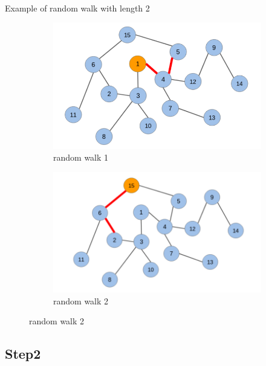     \paragraph{} Example of random walk with length 2
    \begin{figure}[h]
        \centering
        \begin{subfigure}[b]{0.5\textwidth}
                    \includegraphics[width=\textwidth]{tex/img/G1.png}
                    \caption{random walk 1}
            \end{subfigure}%
            \hfill
        \begin{subfigure}[b]{0.5\textwidth}
                    \includegraphics[width=\textwidth]{tex/img/G2.png}
                    \caption{random walk 2}
           \end{subfigure}%
        \end{figure}
    \subsection{Step2}
